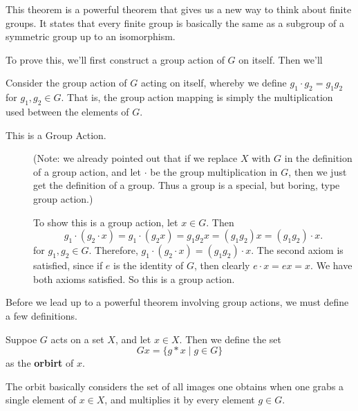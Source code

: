 \documentclass[12pt,letterpaper]{algebra_book}
\theoremstyle{definition}
\begin{document}
    This theorem is a powerful theorem that gives us a new way to
    think about finite groups. It states that every finite group is
    basically the same as a subgroup of a symmetric group up to an
    isomorphism. 

    \begin{prf}
        \textcolor{NavyBlue}{To prove this, we'll first construct a
        group action of $G$ on itself. Then we'll }

        Consider the group action of $G$ acting on itself, whereby we
        define $g_1 \cdot g_2 = g_1g_2$ for $g_1, g_2 \in G$. That is,
        the group action 
        mapping is simply the multiplication used between the elements
        of $G$. 
        \begin{description}
            \item[This is a Group Action.] 
            (Note: we already pointed out that if we replace $X$ with
            $G$ in the definition of a group action, and let $\cdot$
            be the group multiplication in $G$, then we just get the
            definition of a group. Thus a group is a special, but
            boring, type group action.)

            To show this is a group action, let $x \in G$. Then 
            \[
                g_1 \cdot (g_2 \cdot x) = g_1 \cdot (g_2x) = g_1g_2x = (g_1g_2)x = (g_1g_2) \cdot x.
            \]
            for $g_1, g_2 \in G$.
            Therefore, $g_1 \cdot (g_2 \cdot x) = (g_1g_2) \cdot x.$
            The second axiom is satisfied, since if $e$ is the
            identity of $G$, then clearly $e \cdot x = ex = x$. We
            have both axioms satisfied. So this is a group action. 
        \end{description}
    \end{prf}

    Before we lead up to a powerful theorem involving group actions,
    we must define a few definitions. 
    
    \begin{definition}
        Suppoe $G$ acts on a set $X$, and let $x \in X$. Then we
        define the set 
        \[
            Gx = \{g * x \mid g \in G \}
        \]
        as the \textbf{orbirt} of $x$. 
    \end{definition}

    The orbit basically considers the set of all images one obtains
    when one grabs a single element of $x \in X$, and multiplies it by
    every element $g \in G$. {\color{purple}{Note that since $g
    \cdot x \in X$ for every $g \in G, x \in X$, we have that $Gx \subset X$.}}
    
\end{document}

